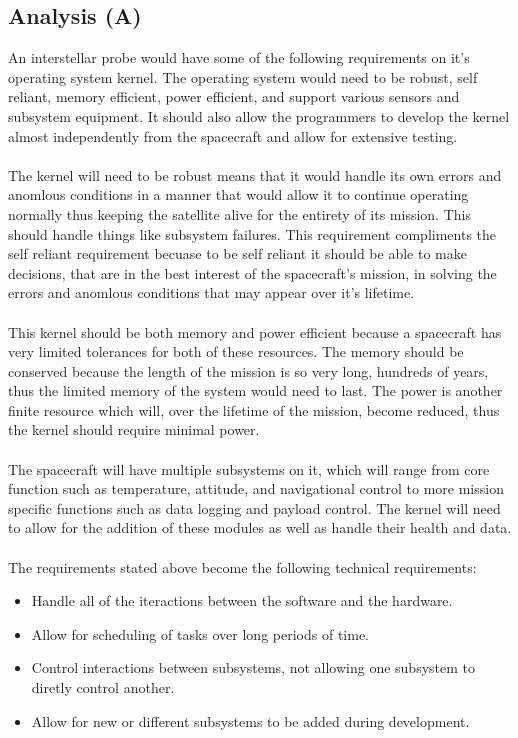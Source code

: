 \documentclass[12pt]{article}
\begin{document}
        \subsection{Analysis (A)}
        An interstellar probe would have some of the following requirements on it's operating system kernel. 
        The operating system would need to be robust, self reliant, memory efficient, power efficient, and support
        various sensors and subsystem equipment. It should also allow the programmers to develop the kernel almost
        independently from the spacecraft and allow for extensive testing.  \\
        \\
        The kernel will need to be robust means that it would handle its own errors and anomlous conditions in a 
        manner that would allow it to continue operating normally thus keeping the satellite alive for the entirety
        of its mission. This should handle things like subsystem failures. This requirement compliments the self 
        reliant requirement becuase to be self reliant it should be able to make decisions, that are in the best interest
        of the spacecraft's mission, in solving the errors and anomlous conditions that may appear over it's lifetime. \\
        \\
        This kernel should be both memory and power efficient because a spacecraft has very limited tolerances for both of
        these resources. The memory should be conserved because the length of the mission is so very long, hundreds of years,
        thus the limited memory of the system would need to last. The power is another finite resource which will, over the 
        lifetime of the mission, become reduced, thus the kernel should require minimal power. \\
        \\
        The spacecraft will have multiple subsystems on it, which will range from core function such as temperature, attitude,
        and navigational control to more mission specific functions such as data logging and payload control. The kernel will 
        need to allow for the addition of these modules as well as handle their health and data.\\
        \\
        The requirements stated above become the following technical requirements:
        \begin{itemize}
            \item Handle all of the iteractions between the software and the hardware.
            \item Allow for scheduling of tasks over long periods of time.
            \item Control interactions between subsystems, not allowing one subsystem to diretly control another.
            \item Allow for new or different subsystems to be added during development.
        \end{itemize}
\end{document}
